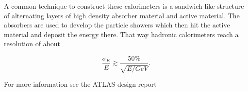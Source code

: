 A common technique to construct these calorimeters is a sandwich like structure of alternating layers of high density absorber material and active material. 
The absorbers are used to develop the particle showers which then hit the active material and deposit the energy there. That way hadronic calorimeters reach a resolution of about

\begin{equation}
\frac{\sigma_E}{E} \gtrsim \frac{50 \%}{\sqrt{E/GeV}}.
\end{equation}


For more information see the ATLAS design report \cite{atlastdr}

